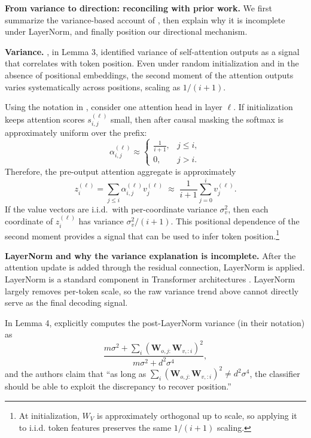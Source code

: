 \documentclass{article}
\theoremstyle{plain}
\theoremstyle{definition}
\theoremstyle{remark}
\begin{document}
\textbf{From variance to direction: reconciling with prior work.} We first summarize the variance-based account of
\citet{chi-etal-2023-latent}, then explain why it is incomplete under LayerNorm, and finally position our directional mechanism.

\textbf{Variance.} \citet{chi-etal-2023-latent}, in Lemma 3, identified variance of self-attention outputs as a signal that correlates with token position. Even under random initialization and in the absence of positional embeddings, the second moment of the attention outputs varies systematically across positions, scaling as $1/(i+1)$.

Using the notation in , consider one attention head in layer $\ell$. If initialization keeps attention scores $s_{i,j}^{(\ell)}$ small, then after causal masking the softmax is approximately uniform over the prefix:
\begin{equation}
\alpha_{i,j}^{(\ell)} \approx
\begin{cases}
\frac{1}{i+1}, & j \le i, \\
0, & j > i.
\end{cases}
\label{eq:first_attn_output}
\end{equation}
Therefore, the pre-output attention aggregate is approximately
\[
z_i^{(\ell)} = \sum_{j\le i}\alpha_{i,j}^{(\ell)} v_j^{(\ell)}
\;\approx\;
\frac{1}{i+1}\sum_{j=0}^{i} v_j^{(\ell)}.
\]
If the value vectors are i.i.d.\ with per-coordinate variance $\sigma_v^2$, then each coordinate of $z_i^{(\ell)}$ has variance $\sigma_v^2/(i+1)$. This positional dependence of the second moment provides a signal that can be used to infer token position.\footnote{At initialization, $W_V$ is approximately orthogonal up to scale, so applying it to i.i.d. token features preserves the same $1/(i+1)$ scaling.}

\textbf{LayerNorm and why the variance explanation is incomplete.}
After the attention update is added through the residual connection, LayerNorm is applied.
LayerNorm is a standard component in Transformer architectures \citep{ba2016layer, Xiong2020OnLN}.
LayerNorm largely removes per-token scale, so the raw variance trend above cannot directly serve as the final decoding signal.

In Lemma 4, \cite{chi-etal-2023-latent} explicitly computes the post-LayerNorm variance (in their notation) as
\[
\frac{ m\sigma^2 + \sum_i \left( \mathbf{W}_{o,j:}\mathbf{W}_{v,:i} \right)^2 }
     { m\sigma^2 + d^2\sigma^4 },
\]
and the authors claim that ``as long as $\sum_i \left( \mathbf{W}_{o,j:}\mathbf{W}_{v,:i} \right)^2 \neq d^2 \sigma^4$, the classifier should be able to exploit the discrepancy to recover position.''
\end{document}
